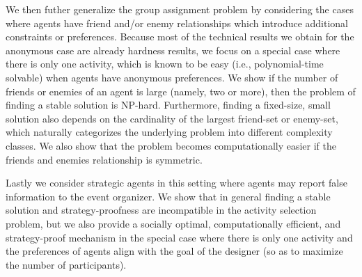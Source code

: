 We then futher generalize the group assignment problem by considering the cases where agents have friend and/or enemy relationships which introduce additional constraints or preferences. Because most of the technical results we obtain for the anonymous case are already hardness results, we focus on a special case where there is only one activity, which is known to be easy (i.e., polynomial-time solvable) when agents have anonymous preferences. We show if the number of friends or enemies of an agent is large (namely, two or more), then the problem of finding a stable solution is NP-hard. Furthermore, finding a fixed-size, small solution also depends on the cardinality of the largest friend-set or enemy-set, which naturally categorizes the underlying problem into different complexity classes. We also show that the problem becomes computationally easier if the friends and enemies relationship is symmetric.

Lastly we consider strategic agents in this setting where agents may report false information to the event organizer. We show that in general finding a stable solution and strategy-proofness are incompatible in the activity selection problem, but we also provide a socially optimal, computationally efficient, and strategy-proof mechanism in the special case where there is only one activity and the preferences of agents align with the goal of the designer (so as to maximize the number of participants).


